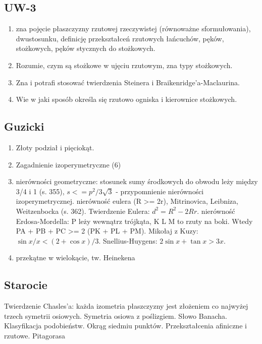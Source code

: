 \subsection{UW-3}
\begin{enumerate}
	\item zna pojęcie płaszczyzny rzutowej rzeczywistej (równoważne sformułowania), dwustosunku, definicję przekształceń rzutowych łańcuchów, pęków, stożkowych, pęków stycznych do stożkowych. 
	\item Rozumie, czym są stożkowe w ujęciu rzutowym, zna typy stożkowych.
	\item Zna i potrafi stosować twierdzenia Steinera i Braikenridge'a-Maclaurina.
	\item Wie w jaki sposób określa się rzutowo ogniska i kierownice stożkowych.
\end{enumerate}

\subsection{Guzicki}
\begin{enumerate}
	\item Złoty podział i pięciokąt.
	\item Zagadnienie izoperymetryczne (6)
	\item nierówności geometryczne: stosunek sumy środkowych do obwodu leży między 3/4 i 1 (s. 355), $s <= p^2 / 3 \sqrt 3$ - przypomnienie nierówności izoperymetrycznej. nierówność eulera (R >= 2r), Mitrinovica, Leibniza, Weitzenbocka (s. 362). Twierdzenie Eulera: $d^2 = R^2 - 2Rr$. nierówność Erdosa-Mordella: P leży wewnątrz trójkąta, K L M to rzuty na boki. Wtedy PA + PB + PC >= 2 (PK + PL + PM). Mikołaj z Kuzy: $\sin x / x < (2 + \cos x) / 3$. Snellius-Huygens: $2 \sin x + \tan x > 3x$.
	\item przekątne w wielokącie, tw. Heinekena %
\end{enumerate}

\subsection{Starocie}
Twierdzenie Chasles'a: każda izometria płaszczyzny jest złożeniem co najwyżej trzech symetrii osiowych.
Symetria osiowa z poślizgiem.
Słowo Banacha.
Klasyfikacja podobieństw.
Okrąg siedmiu punktów. %
Przekształcenia afiniczne i rzutowe.
Pitagorasa %

